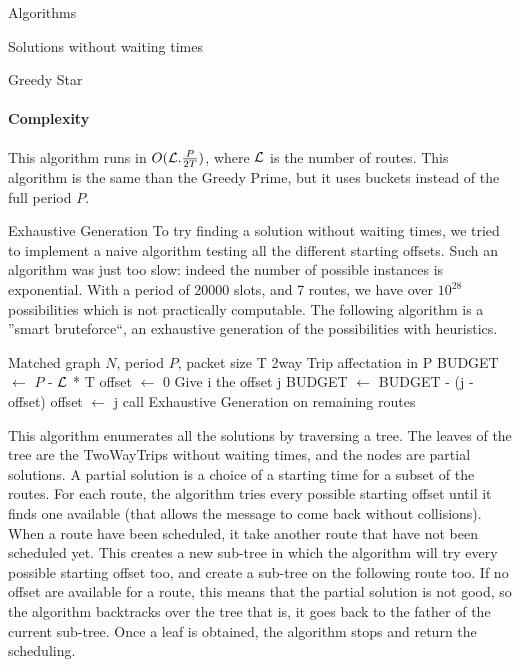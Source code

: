 \documentclass[a4paper,10pt]{report}
\begin{document}
\begin{chapter}{Algorithms}
\begin{section}{Solutions without waiting times}
\begin{subsection}{Greedy Star}
\paragraph{Complexity}
This algorithm runs in $O({\cal L} . \frac{P}{2T})$, where ${\cal L}$ is the number of routes.
This algorithm is the same than the Greedy Prime, but it uses buckets instead of the full period $P$.
\end{subsection}


\begin{subsection}{Exhaustive Generation}
 To try finding a solution without waiting times, we tried to implement a naive algorithm testing all the different starting offsets.
 Such an algorithm was just too slow: indeed the number of possible instances is exponential. With a period of 20000 slots,
 and 7 routes, we have over $10^{28}$ possibilities which is not practically computable.
 The following algorithm is a ''smart bruteforce``, an exhaustive generation of the possibilities with heuristics.
 
\begin{algorithm}[H]
\caption{Exhaustive Generation}
\begin{algorithmic}
\REQUIRE Matched graph $N$, period $P$, packet size T
\ENSURE 2way Trip affectation in P
\STATE BUDGET $\leftarrow$ $P$ - ${\cal L}$ * T
\STATE offset $\leftarrow$ 0
\STATE Give i the offset j
\STATE BUDGET $\leftarrow$ BUDGET - (j - offset)
\STATE offset $\leftarrow$ j
\STATE call Exhaustive Generation on remaining routes
\ENDIF
\ENDFOR
\ENDFOR


\end{algorithmic}
\end{algorithm}

This algorithm enumerates all the solutions by traversing a tree. The leaves of the tree are 
the TwoWayTrips without waiting times, and the nodes are partial solutions. A partial solution is a choice of a starting time for a subset of the routes.
For each route, the algorithm tries every possible starting offset until it finds one available (that allows the message to come back without collisions). When a route have been scheduled, it take another route that have not been scheduled yet.
This creates a new sub-tree in which the algorithm will try every possible starting offset too, and create a sub-tree on the following route too.
If no offset are available for a route, this means that the partial solution is not good, so the algorithm backtracks over the tree that is,
it goes back to the father of the current sub-tree.
Once a leaf is obtained, the algorithm stops and return the scheduling.


\end{subsection}
\end{section}
\end{chapter}
\end{document}

